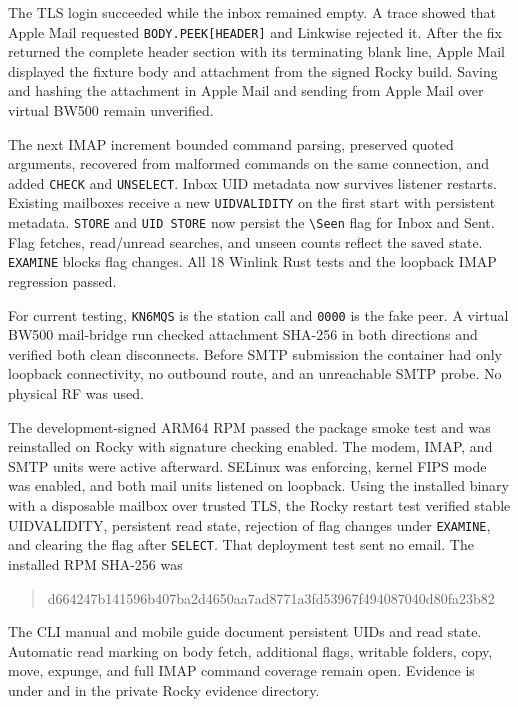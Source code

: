 \documentclass[11pt,a4paper]{article}
\newcommand{\pathtext}[1]{\path{#1}}
\begin{document}
The TLS login succeeded while the inbox remained empty. A trace showed
that Apple Mail requested \texttt{BODY.PEEK[HEADER]} and Linkwise
rejected it. After the fix returned the complete header section with
its terminating blank line, Apple Mail displayed the fixture body and
attachment from the signed Rocky build. Saving and hashing the
attachment in Apple Mail and sending from Apple Mail over virtual
BW500 remain unverified.

The next IMAP increment bounded command parsing, preserved quoted
arguments, recovered from malformed commands on the same connection,
and added \texttt{CHECK} and \texttt{UNSELECT}. Inbox UID metadata now
survives listener restarts. Existing mailboxes receive a new
\texttt{UIDVALIDITY} on the first start with persistent metadata.
\texttt{STORE} and \texttt{UID STORE} now persist the \texttt{\textbackslash Seen}
flag for Inbox and Sent. Flag fetches, read/unread searches, and unseen
counts reflect the saved state. \texttt{EXAMINE} blocks flag changes.
All 18 Winlink Rust tests and the loopback IMAP regression passed.

For current testing, \texttt{KN6MQS} is the station call and
\texttt{0000} is the fake peer. A virtual BW500 mail-bridge run checked
attachment SHA-256 in both directions and verified both clean
disconnects. Before SMTP submission the container had only loopback
connectivity, no outbound route, and an unreachable SMTP probe.
No physical RF was used.

The development-signed ARM64 RPM passed the package smoke test and
was reinstalled on Rocky with signature checking enabled. The modem,
IMAP, and SMTP units were active afterward. SELinux was enforcing,
kernel FIPS mode was enabled, and both mail units listened on
loopback. Using the installed binary with a disposable mailbox over
trusted TLS, the Rocky restart test verified stable UIDVALIDITY,
persistent read state, rejection of flag changes under
\texttt{EXAMINE}, and clearing the flag after \texttt{SELECT}. That
deployment test sent no email. The installed RPM SHA-256 was
\begin{quote}\small\ttfamily
d664247b141596b407ba2d4650aa7ad8771a3fd53967f494087040d80fa23b82
\end{quote}

The CLI manual and mobile guide document persistent UIDs and read
state. Automatic read marking on body fetch, additional flags,
writable folders, copy, move, expunge, and full IMAP command
coverage remain open. Evidence is under
\pathtext{mail-bench/apple-mail-ca} and
\pathtext{mail-bench/imap-seen-rpm} in the private Rocky evidence directory.
\end{document}
